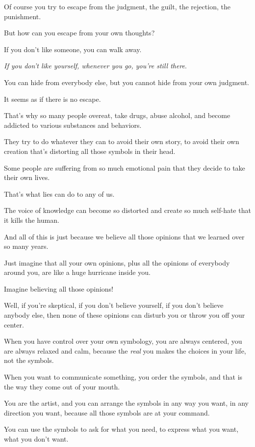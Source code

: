 \documentclass{article}
\numberwithin{equation}{section}
\begin{document}
Of course you try to escape from the judgment, the guilt, the rejection, the punishment.

But how can you escape from your own thoughts?

If you don't like someone, you can walk away.

\textit{If you don't like yourself, whenever you go, you're still there}.

You can hide from everybody else, but you cannot hide from your own judgment.

It seems as if there is no escape.

%
That's why so many people overeat, take drugs, abuse alcohol, and become addicted to various substances and behaviors.

They try to do whatever they can to avoid their own story, to avoid their own creation that's distorting all those symbols in their head.

Some people are suffering from so much emotional pain that they decide to take their own lives.

That's what lies can do to any of us.

The voice of knowledge can become so distorted and create so much self-hate that it kills the human.

And all of this is just because we believe all those opinions that we learned over so many years.

%
Just imagine that all your own opinions, plus all the opinions of everybody around you, are like a huge hurricane inside you.

Imagine believing all those opinions!

Well, if you're skeptical, if you don't believe yourself, if you don't believe anybody else, then none of these opinions can disturb you or throw you off your center.

When you have control over your own symbology, you are always centered, you are always relaxed and calm, because the \textit{real} you makes the choices in your life, not the symbols.

When you want to communicate something, you order the symbols, and that is the way they come out of your mouth.

%
You are the artist, and you can arrange the symbols in any way you want, in any direction you want, because all those symbols are at your command.

You can use the symbols to ask for what you need, to express what you want, what you don't want.
\end{document}

